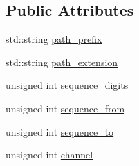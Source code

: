 \subsection*{Public Attributes}
\begin{DoxyCompactItemize}
\item 
std\-::string \hyperlink{classsvl_filter_source_image_file_types_1_1_file_info_a0a9a736a1b3f68aa2ba971cb39e2511c}{path\-\_\-prefix}
\item 
std\-::string \hyperlink{classsvl_filter_source_image_file_types_1_1_file_info_a8100eed2ca16f670fe86811446677a54}{path\-\_\-extension}
\item 
unsigned int \hyperlink{classsvl_filter_source_image_file_types_1_1_file_info_a00b6e0e6685952d16d283d344e39f53f}{sequence\-\_\-digits}
\item 
unsigned int \hyperlink{classsvl_filter_source_image_file_types_1_1_file_info_af7889fa40df40676dcb7ac7b4e2780ab}{sequence\-\_\-from}
\item 
unsigned int \hyperlink{classsvl_filter_source_image_file_types_1_1_file_info_a6a3bbf38978a7fe690c9d3380208a30b}{sequence\-\_\-to}
\item 
unsigned int \hyperlink{classsvl_filter_source_image_file_types_1_1_file_info_a2f3f3f2693ddb7356952aeb7e102a867}{channel}
\end{DoxyCompactItemize}


